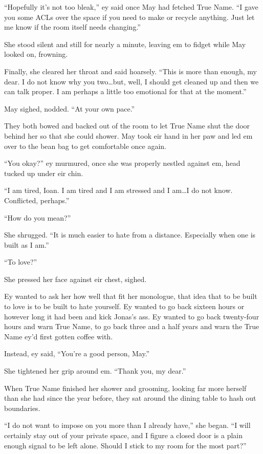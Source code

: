 ``Hopefully it's not too bleak,'' ey said once May had fetched True Name. ``I gave you some ACLs over the space if you need to make or recycle anything. Just let me know if the room itself needs changing.''

She stood silent and still for nearly a minute, leaving em to fidget while May looked on, frowning.

Finally, she cleared her throat and said hoarsely. ``This is more than enough, my dear. I do not know why you two\ldots but, well, I should get cleaned up and then we can talk proper. I am perhaps a little too emotional for that at the moment.''

May sighed, nodded. ``At your own pace.''

They both bowed and backed out of the room to let True Name shut the door behind her so that she could shower. May took eir hand in her paw and led em over to the bean bag to get comfortable once again.

``You okay?'' ey murmured, once she was properly nestled against em, head tucked up under eir chin.

``I am tired, Ioan. I am tired and I am stressed and I am\ldots I do not know. Conflicted, perhaps.''

``How do you mean?''

She shrugged. ``It is much easier to hate from a distance. Especially when one is built as I am.''

``To love?''

She pressed her face against eir chest, sighed.

Ey wanted to ask her how well that fit her monologue, that idea that to be built to love is to be built to hate yourself. Ey wanted to go back sixteen hours or however long it had been and kick Jonas's ass. Ey wanted to go back twenty-four hours and warn True Name, to go back three and a half years and warn the True Name ey'd first gotten coffee with.

Instead, ey said, ``You're a good person, May.''

She tightened her grip around em. ``Thank you, my dear.''

When True Name finished her shower and grooming, looking far more herself than she had since the year before, they sat around the dining table to hash out boundaries.

``I do not want to impose on you more than I already have,'' she began. ``I will certainly stay out of your private space, and I figure a closed door is a plain enough signal to be left alone. Should I stick to my room for the most part?''

